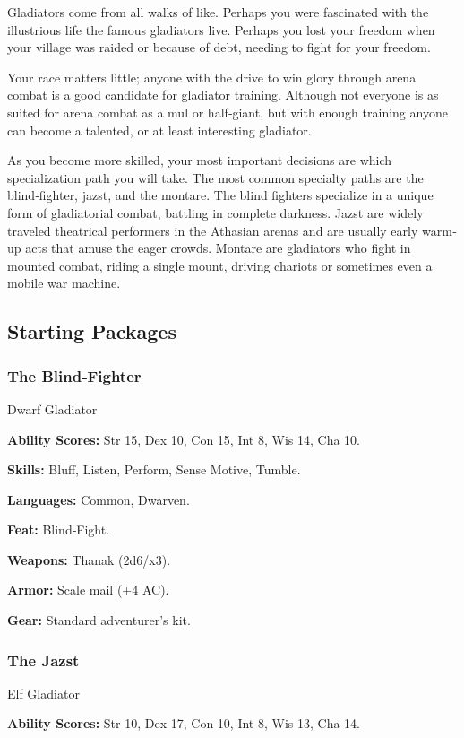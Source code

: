 Gladiators come from all walks of like. Perhaps you were fascinated with the illustrious life the famous gladiators live. Perhaps you lost your freedom when your village was raided or because of debt, needing to fight for your freedom.

Your race matters little; anyone with the drive to win glory through arena combat is a good candidate for gladiator training. Although not everyone is as suited for arena combat as a mul or half‐giant, but with enough training anyone can become a talented, or at least interesting gladiator.

As you become more skilled, your most important decisions are which specialization path you will take. The most common specialty paths are the blind‐fighter, jazst, and the montare. The blind fighters specialize in a unique form of gladiatorial combat, battling in complete darkness. Jazst are widely traveled theatrical performers in the Athasian arenas and are usually early warm‐up acts that amuse the eager crowds. Montare are gladiators who fight in mounted combat, riding a single mount, driving chariots or sometimes even a mobile war machine.

\subsection{Starting Packages}
\subsubsection{The Blind‐Fighter}

Dwarf Gladiator

\textbf{Ability Scores:} Str 15, Dex 10, Con 15, Int 8, Wis 14, Cha 10.

\textbf{Skills:} Bluff, Listen, Perform, Sense Motive, Tumble.

\textbf{Languages:} Common, Dwarven.

\textbf{Feat:} Blind‐Fight.

\textbf{Weapons:} Thanak (2d6/x3).

\textbf{Armor:} Scale mail (+4 AC).

\textbf{Gear:} Standard adventurer’s kit.

\subsubsection{The Jazst}

Elf Gladiator

\textbf{Ability Scores:} Str 10, Dex 17, Con 10, Int 8, Wis 13, Cha 14.

